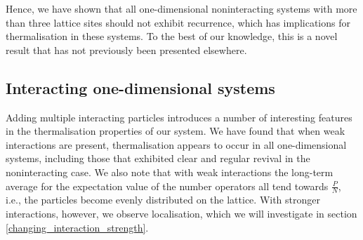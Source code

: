 \documentclass[a4paper, 10pt]{article}
\theoremstyle{plain}
\begin{document}
Hence, we have shown that all one-dimensional noninteracting systems with more
than three lattice sites should not exhibit recurrence, which has implications
for thermalisation in these systems. To the best of our knowledge, this is a
novel result that has not previously been presented elsewhere.


\subsection{Interacting one-dimensional systems}

Adding multiple interacting particles introduces a number of interesting
features in the thermalisation properties of our system. We have found that when
weak interactions are present, thermalisation appears to occur in all
one-dimensional systems, including those that exhibited clear and regular
revival in the noninteracting case. We also note that with weak interactions the
long-term average for the expectation value of the number operators all tend
towards $\frac{P}{N}$, i.e., the particles become evenly distributed on the
lattice. With stronger interactions, however, we observe localisation, which we
will investigate in section \ref{changing_interaction_strength}.
\end{document}
